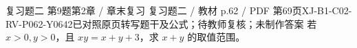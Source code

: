 \par\noindent\begin{minipage}{\linewidth}
\begin{bankitem}{复习题二 第9题}{第2章 / 章末复习 复习题二 / 教材 p.62 / PDF 第69页}{XJ-B1-C02-RV-P062-Y0642}{已对照原页转写题干及公式；待教师复核；未制作答案}
若 $x>0,y>0$，且 $xy=x+y+3$，求 $x+y$ 的取值范围。
\end{bankitem}
\end{minipage}\par\medskip
